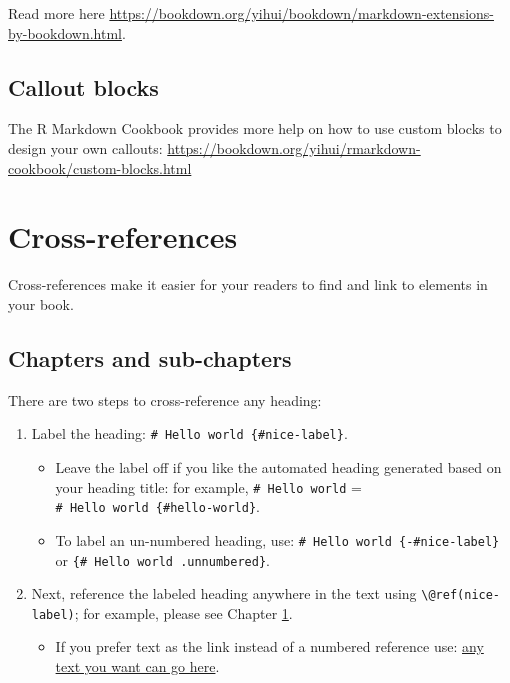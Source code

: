\documentclass[
]{book}
\providecommand{\tightlist}{%
  \setlength{\itemsep}{0pt}\setlength{\parskip}{0pt}}
\theoremstyle{definition}
\theoremstyle{definition}
\theoremstyle{definition}
\theoremstyle{definition}
\theoremstyle{remark}
\begin{document}
Read more here \url{https://bookdown.org/yihui/bookdown/markdown-extensions-by-bookdown.html}.

\hypertarget{callout-blocks}{%
\subsection{Callout blocks}\label{callout-blocks}}

The R Markdown Cookbook provides more help on how to use custom blocks to design your own callouts: \url{https://bookdown.org/yihui/rmarkdown-cookbook/custom-blocks.html}

\hypertarget{cross}{%
\section{Cross-references}\label{cross}}

Cross-references make it easier for your readers to find and link to elements in your book.

\hypertarget{chapters-and-sub-chapters}{%
\subsection{Chapters and sub-chapters}\label{chapters-and-sub-chapters}}

There are two steps to cross-reference any heading:

\begin{enumerate}
\def\labelenumi{\arabic{enumi}.}
\tightlist
\item
  Label the heading: \texttt{\#\ Hello\ world\ \{\#nice-label\}}.

  \begin{itemize}
  \tightlist
  \item
    Leave the label off if you like the automated heading generated based on your heading title: for example, \texttt{\#\ Hello\ world} = \texttt{\#\ Hello\ world\ \{\#hello-world\}}.
  \item
    To label an un-numbered heading, use: \texttt{\#\ Hello\ world\ \{-\#nice-label\}} or \texttt{\{\#\ Hello\ world\ .unnumbered\}}.
  \end{itemize}
\item
  Next, reference the labeled heading anywhere in the text using \texttt{\textbackslash{}@ref(nice-label)}; for example, please see Chapter \ref{cross}.

  \begin{itemize}
  \tightlist
  \item
    If you prefer text as the link instead of a numbered reference use: \protect\hyperlink{cross}{any text you want can go here}.
  \end{itemize}
\end{enumerate}
\end{document}
